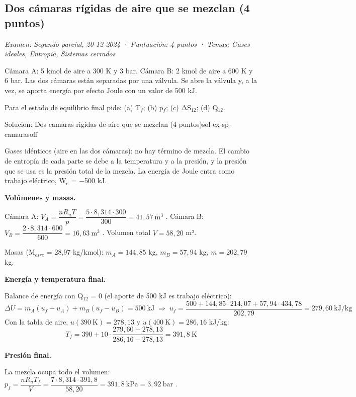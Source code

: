 \documentclass[11pt,a4paper]{article}
\begin{document}
\subsection{Dos cámaras rígidas de aire que se mezclan (4 puntos)}
\noindent\textit{Examen: Segundo parcial, 20-12-2024 · Puntuación: 4 puntos · Temas: Gases ideales, Entropía, Sistemas cerrados}\par\medskip

Cámara A: 5 kmol de aire a 300 K y 3 bar. Cámara B: 2 kmol de aire a 600 K y 6 bar. Las dos cámaras están separadas por una válvula. Se abre la válvula y, a la vez, se aporta energía por efecto Joule con un valor de 500 kJ.

Para el estado de equilibrio final pide: (a) T$_{f}$; (b) p$_{f}$; (c) ΔS$_{12}$; (d) Q$_{12}$.

\begin{ocg}{Solucion: Dos camaras rigidas de aire que se mezclan (4 puntos)}{sol-ex-sp-camaras}{off}
\begin{antesbox}
Gases idénticos (aire en las dos cámaras): no hay término de mezcla. El cambio de entropía de cada parte se debe a la temperatura y a la presión, y la presión que se usa es la presión total de la mezcla. La energía de Joule entra como trabajo eléctrico, W$_{e}$ = −500 kJ.
\end{antesbox}

\par\medskip\noindent\textbf{Volúmenes y masas.}\par
Cámara A:  $V_A = \dfrac{n R_u T}{p} = \dfrac{5\cdot 8{,}314\cdot 300}{300} = 41{,}57\ \text{m}^3$ . Cámara B:  $V_B = \dfrac{2\cdot 8{,}314\cdot 600}{600} = 16{,}63\ \text{m}^3$ . Volumen total  $V = 58{,}20$  m³.

Masas (M$_{aire}$ = 28,97 kg/kmol):  $m_A = 144{,}85$  kg,  $m_B = 57{,}94$  kg,  $m = 202{,}79$  kg.

\par\medskip\noindent\textbf{Energía y temperatura final.}\par
Balance de energía con Q$_{12}$ = 0 (el aporte de 500 kJ es trabajo eléctrico):  \[\Delta U = m_A(u_f - u_A) + m_B(u_f - u_B) = 500\ \text{kJ} \;\Rightarrow\; u_f = \frac{500 + 144{,}85\cdot 214{,}07 + 57{,}94\cdot 434{,}78}{202{,}79} = 279{,}60\ \text{kJ/kg}\]  Con la tabla de aire,  $u(390\ \text{K}) = 278{,}13$  y  $u(400\ \text{K}) = 286{,}16$  kJ/kg:  \[T_f = 390 + 10\cdot\frac{279{,}60 - 278{,}13}{286{,}16 - 278{,}13} = 391{,}8\ \text{K}\]

\par\medskip\noindent\textbf{Presión final.}\par
La mezcla ocupa todo el volumen:  $p_f = \dfrac{n R_u T_f}{V} = \dfrac{7\cdot 8{,}314\cdot 391{,}8}{58{,}20} = 391{,}8\ \text{kPa} = 3{,}92\ \text{bar}$ .


\end{ocg}
\end{document}
